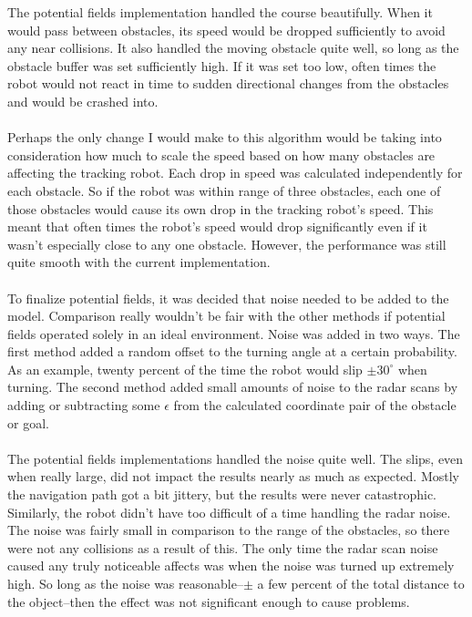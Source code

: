 \documentclass{aiaa-tc}%
\begin{document}
The potential fields implementation handled the course beautifully. When it would pass between obstacles, its speed would be dropped sufficiently to avoid any near collisions. It also handled the moving obstacle quite well, so long as the obstacle buffer was set sufficiently high. If it was set too low, often times the robot would not react in time to sudden directional changes from the obstacles and would be crashed into. \\ \\
Perhaps the only change I would make to this algorithm would be taking into consideration how much to scale the speed based on how many obstacles are affecting the tracking robot. Each drop in speed was calculated independently for each obstacle. So if the robot was within range of three obstacles, each one of those obstacles would cause its own drop in the tracking robot's speed. This meant that often times the robot's speed would drop significantly even if it wasn't especially close to any one obstacle. However, the performance was still quite smooth with the current implementation. \\ \\
To finalize potential fields, it was decided that noise needed to be added to the model. Comparison really wouldn't be fair with the other methods if potential fields operated solely in an ideal environment. Noise was added in two ways. The first method added a random offset to the turning angle at a certain probability. As an example, twenty percent of the time the robot would slip $\pm 30^{\circ}$ when turning. The second method added small amounts of noise to the radar scans by adding or subtracting some $\epsilon$ from the calculated coordinate pair of the obstacle or goal. \\ \\
The potential fields implementations handled the noise quite well. The slips, even when really large, did not impact the results nearly as much as expected. Mostly the navigation path got a bit jittery, but the results were never catastrophic. Similarly, the robot didn't have too difficult of a time handling the radar noise. The noise was fairly small in comparison to the range of the obstacles, so there were not any collisions as a result of this. The only time the radar scan noise caused any truly noticeable affects was when the noise was turned up extremely high. So long as the noise was reasonable--$\pm$ a few percent of the total distance to the object--then the effect was not significant enough to cause problems.
\end{document}
